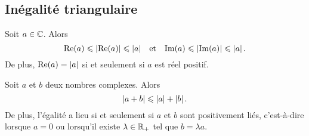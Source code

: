 \documentclass{magnolia}
\begin{document}
\subsection{Inégalité triangulaire}


\begin{proposition}[utile=-3]
Soit $a\in\mathbb{C}$. Alors
\[\mathop{\rm Re}(a)\leqslant\left|\mathop{\rm Re}(a)\right|\leqslant\left|a\right| \quad\!\text{et}\quad\!
  \mathop{\rm Im}(a)\leqslant\left|\mathop{\rm Im}(a)\right|\leqslant\left|a\right|.\]
De plus, $\mathop{\rm Re}(a)=\left|a\right|$ si et seulement si $a$ est réel positif.
\end{proposition}


\begin{proposition}[utile=3, nom=Inégalité triangulaire]
Soit $a$ et $b$ deux nombres complexes. Alors
\[\left|a+b\right|\leqslant\left|a\right|+\left|b\right|.\]
De plus, l'égalité a lieu si et seulement si  $a$ et $b$ sont positivement
liés, c'est-à-dire lorsque $a=0$ ou lorsqu'il existe $\lambda\in\mathbb{R}_+$ tel que
$b=\lambda a$.
\end{proposition}
\end{document}
